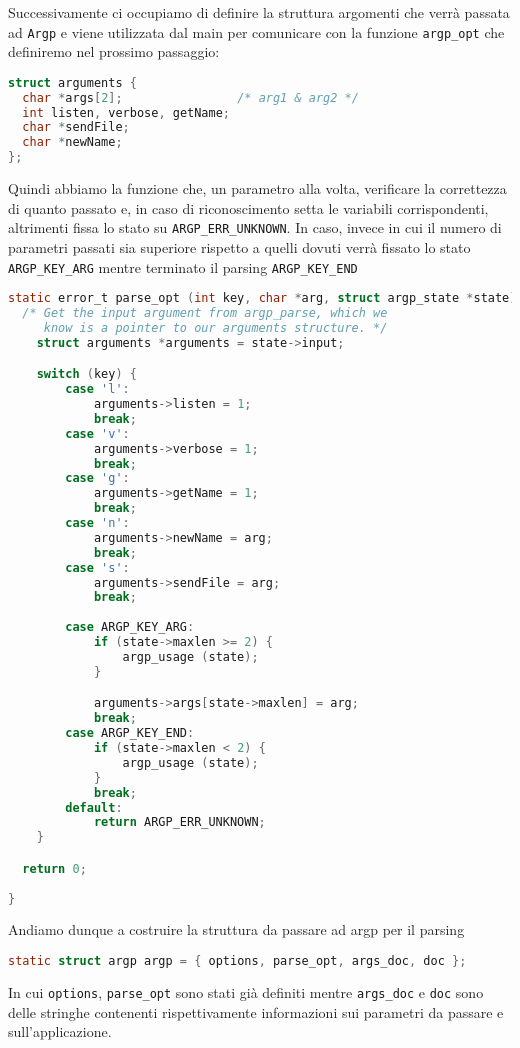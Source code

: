 \documentclass[11pt,fleqn]{book} %
\begin{document}
Successivamente ci occupiamo di definire la struttura argomenti che verrà passata ad \texttt{Argp} e viene utilizzata dal main per comunicare con la funzione \texttt{argp\_opt} che definiremo nel prossimo passaggio:
\begin{lstlisting}[language=C]
struct arguments {
  char *args[2];                /* arg1 & arg2 */
  int listen, verbose, getName;
  char *sendFile;
  char *newName;
};
\end{lstlisting}

Quindi abbiamo la funzione che, un parametro alla volta, verificare la correttezza di quanto passato e, in caso di riconoscimento setta le variabili corrispondenti, altrimenti fissa lo stato su \texttt{ARGP\_ERR\_UNKNOWN}.
In caso, invece in cui il numero di parametri passati sia superiore rispetto a quelli dovuti verrà fissato lo stato \texttt{ARGP\_KEY\_ARG} mentre terminato il parsing \texttt{ARGP\_KEY\_END}

\begin{lstlisting}[language=C]
static error_t parse_opt (int key, char *arg, struct argp_state *state) {
  /* Get the input argument from argp_parse, which we
     know is a pointer to our arguments structure. */
  	struct arguments *arguments = state->input;

  	switch (key) {
    	case 'l':
      		arguments->listen = 1;
      		break;
    	case 'v':
      		arguments->verbose = 1;
      		break;
    	case 'g':
      		arguments->getName = 1;
      		break;		
    	case 'n':
      		arguments->newName = arg;
      		break;		
    	case 's':
      		arguments->sendFile = arg;
      		break;
      		
    	case ARGP_KEY_ARG:
      		if (state->maxlen >= 2) {
        		argp_usage (state);
        	}

      		arguments->args[state->maxlen] = arg;
      		break;
    	case ARGP_KEY_END:
      		if (state->maxlen < 2) {
     			argp_usage (state);
     		}
      		break;
    	default:
      		return ARGP_ERR_UNKNOWN;
    }

  return 0;
  
}

\end{lstlisting}

Andiamo dunque a costruire la struttura da passare ad argp per il parsing
\begin{lstlisting}[language=C]
static struct argp argp = { options, parse_opt, args_doc, doc };
\end{lstlisting}
\noindent In cui \texttt{options}, \texttt{parse\_opt} sono stati già definiti mentre \texttt{args\_doc} e \texttt{doc} sono delle stringhe contenenti rispettivamente informazioni sui parametri da passare e sull'applicazione.
\end{document}
